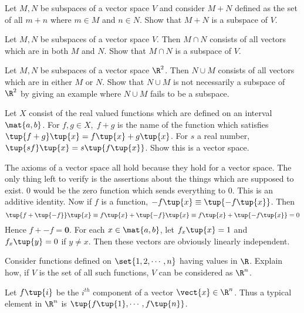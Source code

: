 \begin{enumialphparenastyle}
\begin{ex} Let $M,N$ be subspaces of a vector space $V$ and consider $M+N$
defined as the set of all $m+n$ where $m\in M$ and $n\in N$. Show that $M+N$
is a subspace of $V$.
\end{ex}

\begin{ex} Let $M,N$ be subspaces of a vector space $V$. Then $M\cap N$ consists
of all vectors which are in both $M$ and $N$. Show that $M\cap N$ is a
subspace of $V$.
\end{ex}

\begin{ex} Let $M,N$ be subspaces of a vector space $\R^{2}$. Then $N\cup
M$ consists of all vectors which are in either $M$ or $N$. Show that $N\cup
M $ is not necessarily a subspace of $\R^{2}$ by giving an example
where $N\cup M$ fails to be a subspace.
\end{ex}


\begin{ex} \label{4-july-prob1}Let $X$ consist of the real valued functions which
are defined on an interval $\mat{a,b} $. For $f,g\in X,\;f+g$ is the
name of the function which satisfies $\tup{f+g} \tup{x}
=f\tup{x} +g\tup{x}$. For $s$ a real number, $
\tup{s f} \tup{x} = s \tup{f\tup{x}
} $. Show this is a vector space. 
\begin{sol}
The axioms of a vector space all hold because they
hold for a vector space. The only thing left to verify is the
assertions about the things which are supposed to exist. $0$ would
be the zero function which sends everything to $0$. This is an additive
identity. Now if $f$ is a function, $-f\tup{x} \equiv \tup{
-f\tup{x} } $. Then
\[
\tup{f+\tup{-f} } \tup{x} \equiv f\tup{x}
+\tup{-f} \tup{x} \equiv f\tup{x} +\tup{-f\tup{
x} } =0
\]
Hence $f+-f=\mathbf{0}$. For each $x\in \mat{a,b} $, let $%
f_{x}\tup{x} =1$ and $f_{x}\tup{y} =0$ if $y\neq x$. Then
these vectors are obviously linearly independent.
\end{sol}
\end{ex}

\begin{ex} Consider functions defined on $\set{1,2,\cdots ,n} $ having
values in $\R$. Explain how, if $V$ is the set of all such
functions, $V$ can be considered as $\R^{n}$.
\begin{sol}
Let $f\tup{i} $ be the $i^{th}$ component of a vector $
\vect{x}\in \R^{n}$. Thus a typical element in $\R^{n}$ is $
\tup{f\tup{1} ,\cdots ,f\tup{n} } $.
\end{sol}
\end{ex}


\end{enumialphparenastyle}
